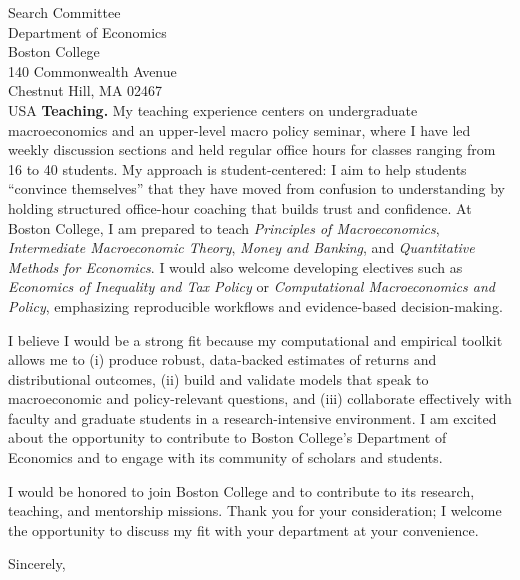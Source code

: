 \documentclass[11pt,letterpaper]{letter}
\begin{document}
\begin{letter}{Search Committee \\
Department of Economics \\
Boston College \\
140 Commonwealth Avenue \\
Chestnut Hill, MA 02467 \\ USA}
\textbf{Teaching.} My teaching experience centers on undergraduate macroeconomics and an upper-level macro policy seminar, where I have led weekly discussion sections and held regular office hours for classes ranging from 16 to 40 students. My approach is student-centered: I aim to help students “convince themselves” that they have moved from confusion to understanding by holding structured office-hour coaching that builds trust and confidence. At Boston College, I am prepared to teach \textit{Principles of Macroeconomics}, \textit{Intermediate Macroeconomic Theory}, \textit{Money and Banking}, and \textit{Quantitative Methods for Economics}. I would also welcome developing electives such as \textit{Economics of Inequality and Tax Policy} or \textit{Computational Macroeconomics and Policy}, emphasizing reproducible workflows and evidence-based decision-making.

I believe I would be a strong fit because my computational and empirical toolkit allows me to (i) produce robust, data-backed estimates of returns and distributional outcomes, (ii) build and validate models that speak to macroeconomic and policy-relevant questions, and (iii) collaborate effectively with faculty and graduate students in a research-intensive environment. I am excited about the opportunity to contribute to Boston College’s Department of Economics and to engage with its community of scholars and students.

I would be honored to join Boston College and to contribute to its research, teaching, and mentorship missions. Thank you for your consideration; I welcome the opportunity to discuss my fit with your department at your convenience.

\closing{Sincerely,}

\end{letter}
\end{document}
